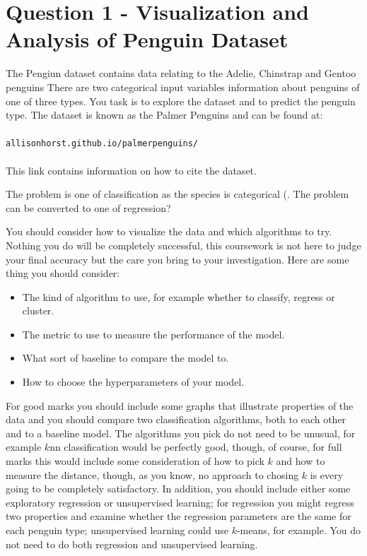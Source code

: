 \documentclass[12pt]{article}
\begin{document}
\section*{Question 1 - Visualization and Analysis of Penguin Dataset}

The Pengiun dataset \cite{PM} contains data relating to the Adelie, Chinstrap and Gentoo penguins
There are two categorical input variables
information about penguins of one of three types. You task is to
explore the dataset and to predict the penguin type. The dataset is
known as the Palmer Penguins and can be found at:\\
\\
\texttt{allisonhorst.github.io/palmerpenguins/}\\
\\
This link contains information on how to cite the dataset.


The problem is one of classification as the species is categorical (. 
The problem can be converted to one of regression?


You should consider how to visualize the data and which algorithms to
try. Nothing you do will be completely successful, this coursework is
not here to judge your final accuracy but the care you bring to your
investigation. Here are some thing you should consider:
\begin{itemize}
  \item The kind of algorithm to use, for example whether to classify, regress  or cluster.
  \item The metric to use to measure the performance of the model.
  \item What sort of baseline to compare the model to.
  \item How to choose the hyperparameters of your model.
\end{itemize}
For good marks you should include some graphs that illustrate
properties of the data and you should compare two classification
algorithms, both to each other and to a baseline model. The algorithms
you pick do not need to be unusual, for example $k$nn classification
would be perfectly good, though, of course, for full marks this would
include some consideration of how to pick $k$ and how to measure the
distance, though, as you know, no approach to chosing $k$ is every
going to be completely satisfactory. In addition, you should include
either some exploratory regression or unsupervised learning; for
regression you might regress two properties and examine whether the
regression parameters are the same for each penguin type; unsupervised
learning could use $k$-means, for example. You do not need to do both
regression and unsupervised learning.
\end{document}
